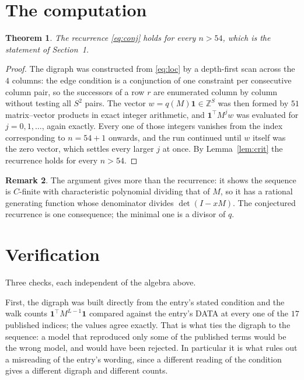 \documentclass[11pt,a4paper]{article}
\theoremstyle{plain}
\newtheorem{theorem}{Theorem}
\theoremstyle{definition}
\newtheorem{remark}[theorem]{Remark}
\begin{document}
\section{The computation}

\begin{theorem}
The recurrence \eqref{eq:conj} holds for every $n>54$, which is the statement of
Section~1.
\end{theorem}

\begin{proof}
The digraph was constructed from \eqref{eq:loc} by a depth-first scan across the $4$
columns: the edge condition is a conjunction of one constraint per consecutive column
pair, so the successors of a row $r$ are enumerated column by column without testing all
$S^2$ pairs. The vector $w=q(M)\mathbf{1}\in\mathbb{Z}^{S}$ was then formed by $51$
matrix--vector products in exact integer arithmetic, and $\mathbf{1}^{\!\top}M^{j}w$ was
evaluated for $j=0,1,\dots$, again exactly. Every one of those integers vanishes from the
index corresponding to $n=54+1$ onwards, and the run continued until $w$ itself was the
zero vector, which settles every larger $j$ at once. By Lemma~\ref{lem:crit} the recurrence
holds for every $n>54$.
\end{proof}

\begin{remark}
The argument gives more than the recurrence: it shows the sequence is $C$-finite with
characteristic polynomial dividing that of $M$, so it has a rational generating function
whose denominator divides $\det(I-xM)$. The conjectured recurrence is one consequence; the
minimal one is a divisor of $q$.
\end{remark}

\section{Verification}

Three checks, each independent of the algebra above.

First, the digraph was built directly from the entry's stated condition and the walk counts
$\mathbf{1}^{\!\top}M^{L-1}\mathbf{1}$ compared against the entry's DATA at
every one of the $17$ published indices; the values agree exactly. That is what ties
the digraph to the sequence: a model that reproduced only some of the published terms would
be the wrong model, and would have been rejected. In particular it is what rules out a
misreading of the entry's wording, since a different reading of the condition gives a
different digraph and different counts.
\end{document}
